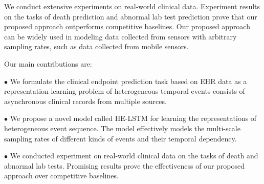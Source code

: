 \documentclass[letterpaper]{article} %
\begin{document}




We conduct extensive experiments on real-world clinical data. Experiment results on the tasks of death prediction and abnormal lab test prediction prove that our proposed approach outperforms competitive baselines. Our proposed approach can be widely used in modeling data collected from sensors with arbitrary sampling rates, such as data collected from mobile sensors.

Our main contributions are:

$\bullet$ We formulate the clinical endpoint prediction task based on EHR data as a representation learning problem of heterogeneous temporal events consists of  asynchronous clinical records from multiple sources.

$\bullet$  We propose a novel model called HE-LSTM for learning the representations of heterogeneous event sequence. The model effectively models the multi-scale sampling rates of different kinds of events and their temporal dependency.


$\bullet$ We conducted experiment on real-world clinical data on the tasks of death and abnormal lab tests. Promising results prove the effectiveness of our proposed approach over competitive baselines.
\end{document}
